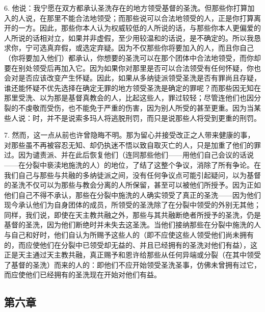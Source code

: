 6. 他说：我宁愿在双方都承认圣洗存在的地方领受基督的圣洗。但那些你打算加入的人说，在那里不能合法地领受；而那些说可以合法地领受的人，正是你打算离开的一方。因此，那些你本人认为权威较低的人所说的话，与那些你本人更偏爱的人所说的话相对立，如果并非虚假，至少用较温和的话说，是不确定的。所以我恳求你，宁可选真弃假，或选定弃疑。因为不仅那些你将要加入的人，而且你自己（你将要加入他们）都承认，你想要的圣洗可以在那个团体中合法地领受，而你却要在别处领受后再加入它。因为如果你对那里是否可以合法领受有任何怀疑，你也会对是否应该改变产生怀疑。因此，如果从多纳徒派领受圣洗是否有罪尚且存疑，谁还能怀疑不优先选择在确定无罪的地方领受圣洗是确定的罪呢？而那些因无知在那里受洗、以为那是基督真教会的人，比起这些人，罪过较轻；尽管连他们也因分裂的不虔敬而受伤，也不能免于严重的伤害，因为别人所受的甚至更重。因为当某些人说：时，并不是说索多玛人将逃脱刑罚，而只是说那些人将受到更重的刑罚。\par

7. 然而，这一点从前也许曾隐晦不明。那为留心并接受改正之人带来健康的事，对那些虽不再被容忍无知、却仍执迷不悟以致自取灭亡的人，只是加重了他们的罪过。因为谴责派、并在此后恢复他们（连同那些他们——用他们自己会议的话说——在分裂中亵渎地施洗的人）的地位，了结了这整个争议，消除了所有争论。在我们自己与那些与共融的多纳徒派之间，没有任何争议点可能引起疑问，以为基督的圣洗不仅可以为那些与教会分离的人所保留，甚至可以被他们所授予。因为正如他们自己不得不承认，那些在分裂中施洗的人确实领受了真正的圣洗——因为他们现今承认他们为自身团体的成员，所领受的圣洗除了在分裂中领受的外别无其他；同样，我们说，即使在天主教共融之外，那些与其共融断绝者所授予的圣洗，仍是基督的圣洗，因为他们断绝时并未失去这圣洗。当他们接纳那些在分裂中施洗的人与自己和好时，他们自认为所赐予这些人的（即不应使这些人领受他们尚未拥有的，而应使他们在分裂中已领受却无益的、并且已经拥有的圣洗对他们有益），这正是天主通过天主教共融，真正赐予和恩许给那些从任何异端或分裂（在其中领受了基督的圣洗）而来的人的：即他们不应开始领受圣洗圣事，仿佛未曾拥有过它，而应使他们已经拥有的圣洗现在开始对他们有益。\par


\subsection{第六章}

